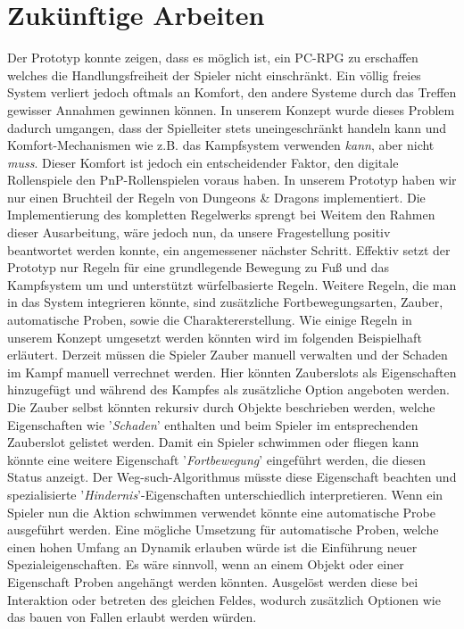 \section{Zukünftige Arbeiten}
\label{sec:futurework}

Der Prototyp konnte zeigen, dass es möglich ist, ein PC-RPG zu erschaffen welches die Handlungsfreiheit der Spieler nicht einschränkt. Ein völlig freies System verliert jedoch oftmals an Komfort, den andere Systeme durch das Treffen gewisser Annahmen gewinnen können. In unserem Konzept wurde dieses Problem dadurch umgangen, dass der Spielleiter stets uneingeschränkt handeln kann und Komfort-Mechanismen wie z.B. das Kampfsystem verwenden \emph{kann}, aber nicht \emph{muss}. Dieser Komfort ist jedoch ein entscheidender Faktor, den digitale Rollenspiele den PnP-Rollenspielen voraus haben. In unserem Prototyp haben wir nur einen Bruchteil der Regeln von Dungeons \& Dragons implementiert. Die Implementierung des kompletten Regelwerks sprengt bei Weitem den Rahmen dieser Ausarbeitung, wäre jedoch nun, da unsere Fragestellung positiv beantwortet werden konnte, ein angemessener nächster Schritt.\newline
Effektiv setzt der Prototyp nur Regeln für eine grundlegende Bewegung zu Fuß und das Kampfsystem um und unterstützt würfelbasierte Regeln. Weitere Regeln, die man in das System integrieren könnte, sind zusätzliche Fortbewegungsarten, Zauber, automatische Proben, sowie die Charaktererstellung. Wie einige Regeln in unserem Konzept umgesetzt werden könnten wird im folgenden Beispielhaft erläutert.\newline
Derzeit müssen die Spieler Zauber manuell verwalten und der Schaden im Kampf manuell verrechnet werden. Hier könnten Zauberslots als Eigenschaften hinzugefügt und während des Kampfes als zusätzliche Option angeboten werden. Die Zauber selbst könnten rekursiv durch Objekte beschrieben werden, welche Eigenschaften wie '\textit{Schaden}' enthalten und beim Spieler im entsprechenden Zauberslot gelistet werden.\newline
Damit ein Spieler schwimmen oder fliegen kann könnte eine weitere Eigenschaft '\textit{Fortbewegung}' eingeführt werden, die diesen Status anzeigt. Der Weg-such-Algorithmus müsste diese Eigenschaft beachten und spezialisierte '\textit{Hindernis}'-Eigenschaften unterschiedlich interpretieren. Wenn ein Spieler nun die Aktion schwimmen verwendet könnte eine automatische Probe ausgeführt werden.\newline
Eine mögliche Umsetzung für automatische Proben, welche einen hohen Umfang an Dynamik erlauben würde ist die Einführung neuer Spezialeigenschaften. Es wäre sinnvoll, wenn an einem Objekt oder einer Eigenschaft Proben angehängt werden könnten. Ausgelöst werden diese bei Interaktion oder betreten des gleichen Feldes, wodurch zusätzlich Optionen wie das bauen von Fallen erlaubt werden würden.\newline
